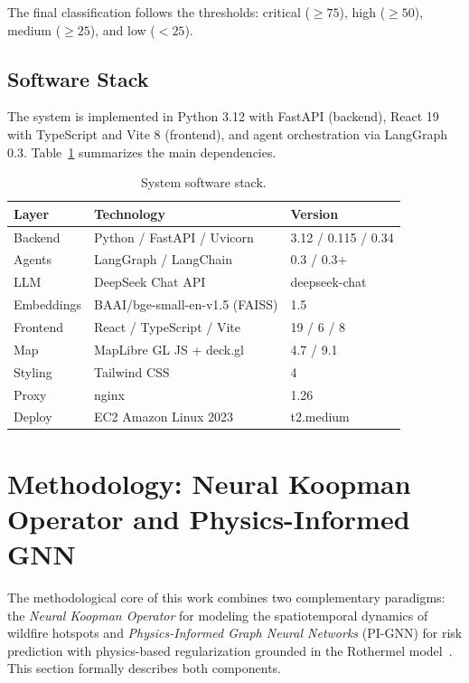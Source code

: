 \documentclass[preprint,12pt,times,numbers]{elsarticle}
\begin{document}
The final classification follows the thresholds: critical ($\ge 75$), high ($\ge 50$), medium ($\ge 25$), and low ($< 25$).

\subsection{Software Stack}
\label{sec:software-stack}

The system is implemented in Python 3.12 with FastAPI (backend), React 19 with TypeScript and Vite 8 (frontend), and agent orchestration via LangGraph 0.3. Table~\ref{tab:software-stack} summarizes the main dependencies.

\begin{table}[htbp]
\centering
\caption{System software stack.}
\label{tab:software-stack}
\small
\begin{tabular}{@{}lll@{}}
\toprule
\textbf{Layer} & \textbf{Technology} & \textbf{Version} \\
\midrule
Backend & Python / FastAPI / Uvicorn & 3.12 / 0.115 / 0.34 \\
Agents & LangGraph / LangChain & 0.3 / 0.3+ \\
LLM & DeepSeek Chat API & deepseek-chat \\
Embeddings & BAAI/bge-small-en-v1.5 (FAISS) & 1.5 \\
Frontend & React / TypeScript / Vite & 19 / 6 / 8 \\
Map & MapLibre GL JS + deck.gl & 4.7 / 9.1 \\
Styling & Tailwind CSS & 4 \\
Proxy & nginx & 1.26 \\
Deploy & EC2 Amazon Linux 2023 & t2.medium \\
\bottomrule
\end{tabular}
\end{table}

\section{Methodology: Neural Koopman Operator and Physics-Informed GNN}
\label{sec:methodology}

The methodological core of this work combines two complementary paradigms: the \emph{Neural Koopman Operator} for modeling the spatiotemporal dynamics of wildfire hotspots and \emph{Physics-Informed Graph Neural Networks} (PI-GNN) for risk prediction with physics-based regularization grounded in the Rothermel model~\cite{article:rothermel1972}. This section formally describes both components.
\end{document}
